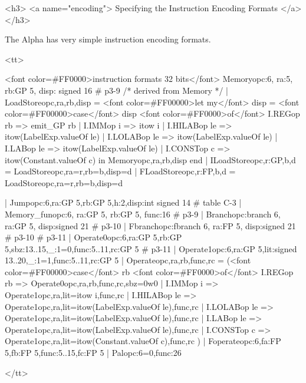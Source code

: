 <h3> <a name="encoding">
     Specifying the Instruction Encoding Formats </a></h3>

    The Alpha has very simple instruction encoding formats.

<tt>
\begin{SML}
   <font color=#FF0000>instruction formats 32 bits</font>
     Memory{opc:6, ra:5, rb:GP 5, disp: signed 16} #  p3-9 
      /* derived from Memory */ 
   | LoadStore{opc,ra,rb,disp} =
       <font color=#FF00000>let my</font> disp = 
           <font color=#FF00000>case</font> disp <font color=#FF0000>of</font>
             I.REGop rb => emit_GP rb
           | I.IMMop i  => itow i
           | I.HILABop le => itow(LabelExp.valueOf le)
           | I.LOLABop le => itow(LabelExp.valueOf le)
           | I.LABop le => itow(LabelExp.valueOf le)
           | I.CONSTop c => itow(Constant.valueOf c)
       in  Memory{opc,ra,rb,disp}
       end
   | ILoadStore{opc,r:GP,b,d} = LoadStore{opc,ra=r,rb=b,disp=d}
   | FLoadStore{opc,r:FP,b,d} = LoadStore{opc,ra=r,rb=b,disp=d}

   | Jump{opc:6,ra:GP 5,rb:GP 5,h:2,disp:int signed 14}   #  table C-3 
   | Memory_fun{opc:6, ra:GP 5, rb:GP 5, func:16}     #  p3-9 
   | Branch{opc:branch 6, ra:GP 5, disp:signed 21}           #  p3-10 
   | Fbranch{opc:fbranch 6, ra:FP 5, disp:signed 21}          #  p3-10 
        #  p3-11 
   | Operate0{opc:6,ra:GP 5,rb:GP 5,sbz:13..15,_:1=0,func:5..11,rc:GP 5} 
        #  p3-11 
   | Operate1{opc:6,ra:GP 5,lit:signed 13..20,_:1=1,func:5..11,rc:GP 5} 
   | Operate{opc,ra,rb,func,rc} =
        (<font color=#FF00000>case</font> rb <font color=#FF0000>of</font>
          I.REGop rb => Operate0{opc,ra,rb,func,rc,sbz=0w0}
        | I.IMMop i  => Operate1{opc,ra,lit=itow i,func,rc}
        | I.HILABop le => Operate1{opc,ra,lit=itow(LabelExp.valueOf le),func,rc}
        | I.LOLABop le => Operate1{opc,ra,lit=itow(LabelExp.valueOf le),func,rc}
        | I.LABop le => Operate1{opc,ra,lit=itow(LabelExp.valueOf le),func,rc}
        | I.CONSTop c => Operate1{opc,ra,lit=itow(Constant.valueOf c),func,rc}
        )
   | Foperate{opc:6,fa:FP 5,fb:FP 5,func:5..15,fc:FP 5}
   | Pal{opc:6=0,func:26}
\end{SML}
</tt>

